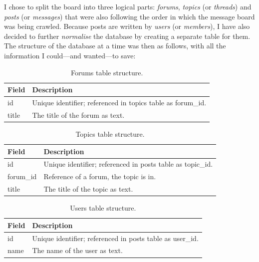     I chose to split the board into three logical parts: \emph{forums}, \emph{topics} (or \emph{threads}) and \emph{posts} (or \emph{messages}) that were also following the order in which the message board was being crawled. Because posts are written by \emph{users} (or \emph{members}), I have also decided to further \emph{normalise} the database by creating a separate table for them. The structure of the database at a time was then as follows, with all the information I could---and wanted---to save:
    \begin{table}[H]
      \begin{tabularx}{\textwidth}{|L{0.3}|L{1.7}|} \hline
         \textbf{Field} & \textbf{Description} \\\hline
        id & Unique identifier; referenced in topics table as forum\_id. \\
        title & The title of the forum as text. \\\hline
      \end{tabularx}
      \caption{Forums table structure.}
    \end{table}
    \begin{table}[H]
      \begin{tabularx}{\textwidth}{|L{0.3}|L{1.7}|} \hline
         \textbf{Field} & \textbf{Description} \\\hline
        id & Unique identifier; referenced in posts table as topic\_id. \\
        forum\_id & Reference of a forum, the topic is in. \\
        title & The title of the topic as text. \\\hline
      \end{tabularx}
      \caption{Topics table structure.}
    \end{table}
    \begin{table}[H]
      \begin{tabularx}{\textwidth}{|L{0.3}|L{1.7}|} \hline
         \textbf{Field} & \textbf{Description} \\\hline
        id & Unique identifier; referenced in posts table as user\_id. \\
        name & The name of the user as text. \\\hline
      \end{tabularx}
      \caption{Users table structure.}
    \end{table}
